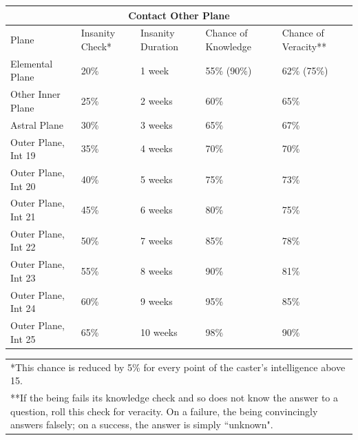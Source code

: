 \noindent
\begin{tabular}{|p{}|p{}|p{}|p{}|p{}|}
\multicolumn{5}{c}{Contact Other Plane} \\
\hline
Plane				& Insanity Check*	& Insanity Duration	& Chance of Knowledge	& Chance of Veracity** \\
\hline\hline
\rowcolor[gray]{.9}Elemental Plane		& 20\%			& 1 week				& 55\% (90\%)			& 62\% (75\%) \\
Other Inner Plane	& 25\%			& 2 weeks				& 60\%				& 65\% \\
\rowcolor[gray]{.9}Astral Plane		& 30\%			& 3 weeks				& 65\%				& 67\% \\
Outer Plane, Int 19	& 35\%			& 4 weeks				& 70\%				& 70\% \\
\rowcolor[gray]{.9}Outer Plane, Int 20	& 40\%			& 5 weeks				& 75\%				& 73\% \\
Outer Plane, Int 21	& 45\%			& 6 weeks				& 80\%				& 75\% \\
\rowcolor[gray]{.9}Outer Plane, Int 22	& 50\%			& 7 weeks				& 85\%				& 78\% \\
Outer Plane, Int 23	& 55\%			& 8 weeks				& 90\%				& 81\% \\
\rowcolor[gray]{.9}Outer Plane, Int 24	& 60\%			& 9 weeks				& 95\%				& 85\% \\
Outer Plane, Int 25	& 65\%			& 10 weeks				& 98\%				& 90\% \\
\hline
\end{tabular}

\noindent\begin{tabular}{p{}}
*This chance is reduced by 5\% for every point of the caster's intelligence above 15. \\
**If the being fails its knowledge check and so does not know the answer to a question, roll this check for veracity.  On a failure, the being convincingly answers falsely; on a success, the answer is simply ``unknown". \\
\end{tabular}\vspace{.5em}

